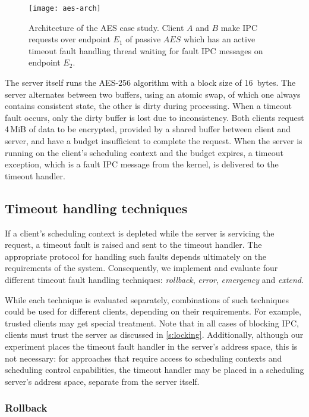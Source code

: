 \begin{figure}
\centering
\texttt{[image: aes-arch]}
\caption[Architecture of the AES case study.]{Architecture of the \gls{AES} case study. Client $A$ and $B$ make \gls{IPC} requests over
endpoint $E_{1}$ of passive $AES$ which has an active timeout fault handling thread waiting for
fault \gls{IPC} messages on endpoint $E_{2}$.}
\label{f:aes-arch}
\end{figure}

The server itself runs the AES-256 algorithm with a block size of 16~bytes. The server alternates between two
buffers, using an atomic swap, of which one always contains consistent state, the other is
dirty during processing. When a timeout fault occurs, only the dirty buffer is lost due to
inconsistency. Both clients request 4\,MiB of data to be encrypted, provided by a shared buffer
between client and server, and have a budget insufficient to
complete the request. When the server is running on the client's scheduling context and the budget
expires, a timeout exception, which is a fault IPC message from the kernel, is delivered to the timeout
handler. 

\subsection{Timeout handling techniques}

If a client's scheduling context is depleted while the server is servicing the request, a timeout fault
is raised and sent to the timeout handler.  The appropriate protocol for handling such faults
depends ultimately on the requirements of the system.  Consequently, we implement and evaluate four
different timeout fault handling techniques: \emph{rollback}, \emph{error}, \emph{emergency} and
\emph{extend}. 

While each technique is evaluated separately, combinations of such techniques could be used for
different clients, depending on their requirements. For example, trusted clients may get special
treatment. Note that in all cases of blocking IPC, clients must trust the server as discussed in
\cref{s:locking}. Additionally, although our experiment places 
the timeout fault handler in the server's address
space, this is not necessary: for approaches that require access to scheduling contexts and
scheduling control capabilities, the timeout handler may be placed in a scheduling server's address
space, separate from the server itself.

\subsubsection{Rollback}

